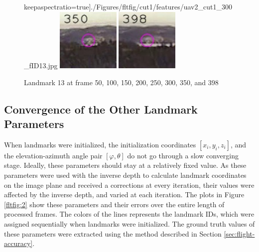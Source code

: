 \begin{figure}[h]
keepaspectratio=true]{./Figures/fltfig/cut1/features/uav2_cut1_300_fID13.jpg}
\includegraphics[width=3cm,
keepaspectratio=true]{./Figures/fltfig/cut1/features/uav2_cut1_350_fID13.jpg}
\includegraphics[width=3cm,
keepaspectratio=true]{./Figures/fltfig/cut1/features/uav2_cut1_398_fID13.jpg}
\caption{Landmark 13 at frame 50, 100, 150, 200, 250, 300, 350, and 398}
\label{fltfig:1_1}
\end{figure}

\subsection{Convergence of the Other Landmark Parameters}
When landmarks were initialized, the initialization coordinates $[x_i,
y_i, z_i]$, and the elevation-azimuth angle pair $[\varphi, \theta]$
do not go through a slow converging stage. Ideally, these parameters
should stay at a relatively fixed value. As these parameters were used
with the inverse depth to calculate landmark coordinates on the image
plane and received a corrections at every iteration, their values were
affected by the inverse depth, and varied at each iteration. The plots
in Figure \ref{fltfig:2} show these parameters and their errors over
the entire length of processed frames. The colors of the lines
represents the landmark IDs, which were assigned sequentially when
landmarks were initialized. The ground truth values of these
parameters were extracted using the method described in Section
\ref{sec:flight-accuracy}.

